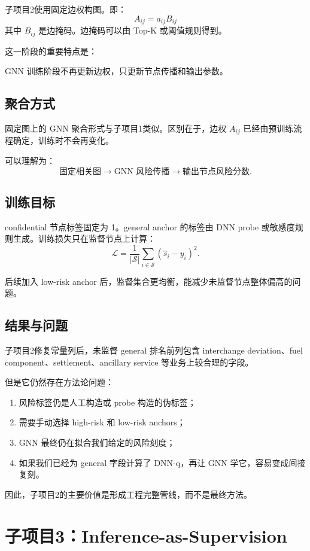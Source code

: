 \documentclass[UTF8]{ctexart}
\begin{document}
子项目2使用固定边权构图。即：
\[
A_{ij}=a_{ij}B_{ij}
\]
其中 \(B_{ij}\) 是边掩码。边掩码可以由 Top-K 或阈值规则得到。

这一阶段的重要特点是：
\begin{center}
GNN 训练阶段不再更新边权，只更新节点传播和输出参数。
\end{center}

\subsection{聚合方式}

固定图上的 GNN 聚合形式与子项目1类似。区别在于，边权 \(A_{ij}\) 已经由预训练流程确定，训练时不会再变化。

可以理解为：
\[
\text{固定相关图}
\rightarrow
\text{GNN 风险传播}
\rightarrow
\text{输出节点风险分数}.
\]

\subsection{训练目标}

confidential 节点标签固定为 1。general anchor 的标签由 DNN probe 或敏感度规则生成。训练损失只在监督节点上计算：
\[
\mathcal{L}
=
\frac{1}{|\mathcal{S}|}
\sum_{i\in\mathcal{S}}
(\hat{s}_i-y_i)^2.
\]

后续加入 low-risk anchor 后，监督集合更均衡，能减少未监督节点整体偏高的问题。

\subsection{结果与问题}

子项目2修复常量列后，未监督 general 排名前列包含 interchange deviation、fuel component、settlement、ancillary service 等业务上较合理的字段。

但是它仍然存在方法论问题：
\begin{enumerate}
    \item 风险标签仍是人工构造或 probe 构造的伪标签；
    \item 需要手动选择 high-risk 和 low-risk anchors；
    \item GNN 最终仍在拟合我们给定的风险刻度；
    \item 如果我们已经为 general 字段计算了 DNN-q，再让 GNN 学它，容易变成间接复刻。
\end{enumerate}

因此，子项目2的主要价值是形成工程完整管线，而不是最终方法。

\section{子项目3：Inference-as-Supervision}
\end{document}
